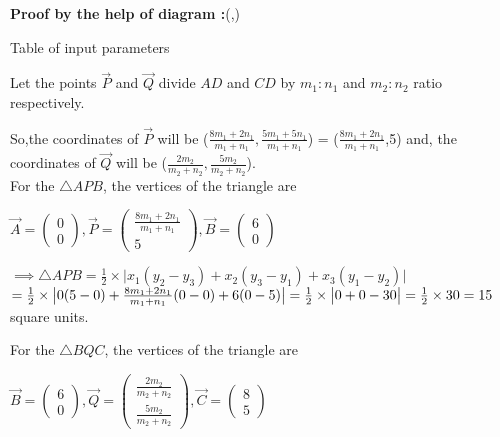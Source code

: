 \documentclass[12pt]{article}
\begin{document}
\textbf{Proof by the help of diagram :}(,)
\begin{table}[H]
	\centering
	
	\caption{Table of input parameters}
	\label{tab:tab:1}
\end{table}


Let the points $\vec{P}$ and $\Vec{Q}$ divide $AD$ and $CD$ by $m_1:n_1$ and $m_2:n_2$ ratio respectively.

So,the coordinates of $\Vec{P}$ will be ($\frac{8m_1+2n_1}{m_1+n_1},\frac{5m_1+5n_1}{m_1+n_1}$) = ($\frac{8m_1+2n_1}{m_1+n_1}$,5) and, the coordinates of $\Vec{Q}$ will be ($\frac{2m_2}{m_2+n_2},\frac{5m_2}{m_2+n_2}$).\\
For the $\triangle APB$, the vertices of the triangle are

   $\Vec{A}=\begin{pmatrix}
       0\\0
   \end{pmatrix},
   \Vec{P}=\begin{pmatrix}
       \frac{8m_1+2n_1}{m_1+n_1}\\5
   \end{pmatrix},
   \Vec{B}=\begin{pmatrix}
       6\\0
   \end{pmatrix}$

   
$\implies \triangle APB = \frac{1}{2}\times \big |x_1(y_2-y_3)+x_2(y_3-y_1)+x_3(y_1-y_2) \big|$\\
$ = \frac{1}{2} \times \big |0(5-0)+\frac{8m_1+2n_1}{m_1+n_1}(0-0)+6(0-5)\big|\\
 = \frac{1}{2} \times\big |0+0-30\big|\\
 =\frac{1}{2} \times30\\
 =15 $ square units.


 For the $\triangle BQC$, the vertices of the triangle are
 
   $\Vec{B}=\begin{pmatrix}
       6\\0
   \end{pmatrix},
   \Vec{Q}=\begin{pmatrix}
       \frac{2m_2}{m_2+n_2}\\\frac{5m_2}{m_2+n_2}
   \end{pmatrix},
   \Vec{C}=\begin{pmatrix}
       8\\5
   \end{pmatrix}$
\end{document}
